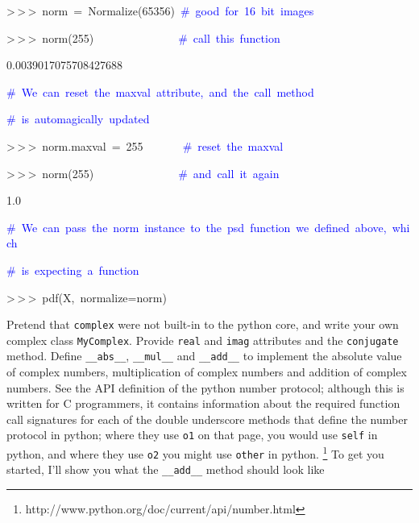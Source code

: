 \begin{lyxcode}
>\,{}>\,{}>~norm~=~Normalize(65356)~\textcolor{blue}{\#~good~for~16~bit~images}

>\,{}>\,{}>~norm(255)~~~~~~~~~~~~~~~\textcolor{blue}{\#~call~this~function}

0.0039017075708427688



\textcolor{blue}{\#~We~can~reset~the~maxval~attribute,~and~the~call~method~}

\textcolor{blue}{\#~is~automagically~updated}

>\,{}>\,{}>~norm.maxval~=~255~~~~~~~\textcolor{blue}{\#~reset~the~maxval}

>\,{}>\,{}>~norm(255)~~~~~~~~~~~~~~~\textcolor{blue}{\#~and~call~it~again}

1.0



\textcolor{blue}{\#~We~can~pass~the~norm~instance~to~the~psd~function~we~defined~above,~which~}

\textcolor{blue}{\#~is~expecting~a~function}

>\,{}>\,{}>~pdf(X,~normalize=norm)~~~~~~~~~~~~
\end{lyxcode}
\begin{xca}
Pretend that \texttt{complex} were not built-in to the python core,
and write your own complex class \texttt{MyComplex}. Provide \texttt{real}
and \texttt{imag} attributes and the \texttt{conjugate} method. Define
\texttt{\_\_abs\_\_}, \texttt{\_\_mul\_\_} and \texttt{\_\_add\_\_}
to implement the absolute value of complex numbers, multiplication
of complex numbers and addition of complex numbers. See the API definition
of the python number protocol; although this is written for C programmers,
it contains information about the required function call signatures
for each of the double underscore methods that define the number protocol
in python; where they use \texttt{o1} on that page, you would use
\texttt{self} in python, and where they use \texttt{o2} you might
use \texttt{other} in python.%
\footnote{http://www.python.org/doc/current/api/number.html%
} To get you started, I'll show you what the \texttt{\_\_add\_\_} method
should look like
\end{xca}
